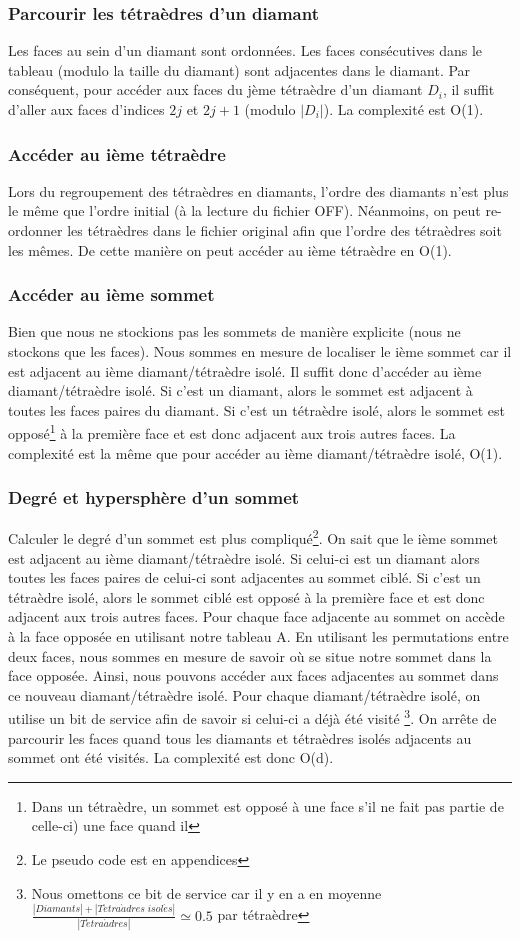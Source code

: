 \subsubsection{Parcourir les tétraèdres d'un diamant}
\noindent
Les faces au sein d'un diamant sont ordonnées. Les faces consécutives dans le tableau (modulo la taille du diamant) sont adjacentes dans le diamant. Par conséquent, pour accéder aux faces du jème tétraèdre d'un diamant $D_i$, il suffit d'aller aux faces d'indices $2j$ et $2j+1$ (modulo $|D_i|$). La complexité est O(1).
\subsubsection{Accéder au ième tétraèdre}
\noindent
Lors du regroupement des tétraèdres en diamants, l'ordre des diamants n'est plus le même que l'ordre initial (à la lecture du fichier OFF). Néanmoins, on peut re-ordonner les tétraèdres dans le fichier original afin que l'ordre des tétraèdres soit les mêmes. De cette manière on peut accéder au ième tétraèdre en O(1).
\subsubsection{Accéder au ième sommet}
\noindent
Bien que nous ne stockions pas les sommets de manière explicite (nous ne stockons que les faces). Nous sommes en mesure de localiser le ième sommet car il est adjacent au ième diamant/tétraèdre isolé.
Il suffit donc d'accéder au ième diamant/tétraèdre isolé. Si c'est un diamant, alors le sommet est adjacent à toutes les faces paires du diamant. Si c'est un tétraèdre isolé, alors le sommet est opposé\footnote{Dans un tétraèdre, un sommet est opposé à une face s'il ne fait pas partie de celle-ci) une face quand il} à la première face et est donc adjacent aux trois autres faces. La complexité est la même que pour accéder au ième diamant/tétraèdre isolé, O(1).
\subsubsection{Degré et hypersphère d'un sommet}
\noindent
Calculer le degré d'un sommet est plus compliqué\footnote{Le pseudo code est en appendices}. On sait que le ième sommet est adjacent au ième diamant/tétraèdre isolé. Si celui-ci est un diamant alors toutes les faces paires de celui-ci sont adjacentes au sommet ciblé. Si c'est un tétraèdre isolé, alors le sommet ciblé est opposé à la première face et est donc adjacent aux trois autres faces. Pour chaque face adjacente au sommet on accède à la face opposée en utilisant notre tableau A. En utilisant les permutations entre deux faces, nous sommes en mesure de savoir où se situe notre sommet dans la face opposée. Ainsi, nous pouvons accéder aux faces adjacentes au sommet dans ce nouveau diamant/tétraèdre isolé. Pour chaque diamant/tétraèdre isolé, on utilise un bit de service afin de savoir si celui-ci a déjà été visité \footnote{Nous omettons ce bit de service car il y en a en moyenne $\frac{|Diamants| + |T\acute{e}tra\grave{a}dres \; isol\acute{e}s|}{|T\acute{e}tra\grave{a}dres|}\simeq 0.5$ par tétraèdre}. On arrête de parcourir les faces quand tous les diamants et tétraèdres isolés adjacents au sommet ont été visités. La complexité est donc O(d).
